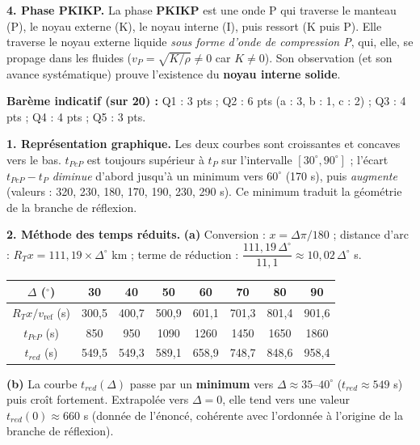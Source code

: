 \documentclass[11pt]{article}
\begin{document}
\begin{corrige}
\textbf{4. Phase PKIKP.} La phase \textbf{PKIKP} est une onde P qui traverse le manteau (P), le noyau externe (K), le noyau interne (I), puis ressort (K puis P). Elle traverse le noyau externe liquide \emph{sous forme d'onde de compression P}, qui, elle, se propage dans les fluides ($v_P = \sqrt{K/\rho} \neq 0$ car $K \neq 0$). Son observation (et son avance systématique) prouve l'existence du \textbf{noyau interne solide}.
\end{corrige}

\begin{corrige}
\textbf{Barème indicatif (sur 20) :} Q1 : 3 pts ; Q2 : 6 pts (a : 3, b : 1, c : 2) ; Q3 : 4 pts ; Q4 : 4 pts ; Q5 : 3 pts.

\textbf{1. Représentation graphique.} Les deux courbes sont croissantes et concaves vers le bas. $t_{PcP}$ est toujours supérieur à $t_P$ sur l'intervalle $[30^\circ, 90^\circ]$ ; l'écart $t_{PcP} - t_P$ \emph{diminue} d'abord jusqu'à un minimum vers $60^\circ$ (170 s), puis \emph{augmente} (valeurs : 320, 230, 180, 170, 190, 230, 290 s). Ce minimum traduit la géométrie de la branche de réflexion.

\textbf{2. Méthode des temps réduits.}
\textbf{(a)} Conversion : $x = \Delta \pi/180$ ; distance d'arc : $R_T x = 111{,}19 \times \Delta^\circ$ km ; terme de réduction : $\dfrac{111{,}19\,\Delta^\circ}{11{,}1} \approx 10{,}02\,\Delta^\circ$ s.

\begin{center}
\begin{tabular}{|c|ccccccc|}\hline
$\Delta$ ($^\circ$) & 30 & 40 & 50 & 60 & 70 & 80 & 90 \\ \hline
$R_T x / v_{\text{ref}}$ (s) & 300{,}5 & 400{,}7 & 500{,}9 & 601{,}1 & 701{,}3 & 801{,}4 & 901{,}6 \\
$t_{PcP}$ (s) & 850 & 950 & 1090 & 1260 & 1450 & 1650 & 1860 \\ \hline
$t_{red}$ (s) & 549{,}5 & 549{,}3 & 589{,}1 & 658{,}9 & 748{,}7 & 848{,}6 & 958{,}4 \\ \hline
\end{tabular}
\end{center}

\textbf{(b)} La courbe $t_{red}(\Delta)$ passe par un \textbf{minimum} vers $\Delta \approx 35$--$40^\circ$ ($t_{red} \approx 549$ s) puis croît fortement. Extrapolée vers $\Delta = 0$, elle tend vers une valeur $t_{red}(0) \approx 660$ s (donnée de l'énoncé, cohérente avec l'ordonnée à l'origine de la branche de réflexion).


\end{corrige}
\end{document}
